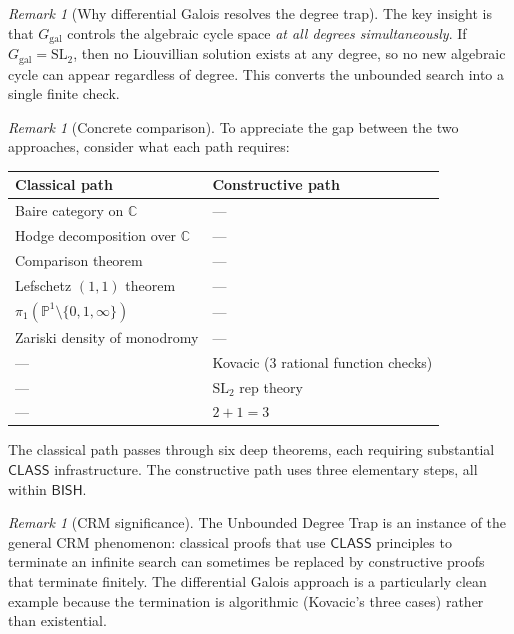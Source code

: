 \documentclass[11pt]{article}
\theoremstyle{plain}
\theoremstyle{definition}
\theoremstyle{remark}
\newtheorem{remark}[theorem]{Remark}
\newcommand{\C}{\mathbb{C}}
\newcommand{\SL}{\mathrm{SL}}
\newcommand{\Ggal}{G_{\mathrm{gal}}}
\newcommand{\BISH}{\mathsf{BISH}}
\newcommand{\CLASS}{\mathsf{CLASS}}
\begin{document}
\begin{remark}[Why differential Galois resolves the degree trap]
The key insight is that $\Ggal$ controls the algebraic cycle space \emph{at all degrees simultaneously}.
If $\Ggal = \SL_2$, then no Liouvillian solution exists at any degree, so no new algebraic cycle can appear regardless of degree.
This converts the unbounded search into a single finite check.
\end{remark}

\begin{remark}[Concrete comparison]
To appreciate the gap between the two approaches, consider what each path requires:
\begin{center}
\small
\begin{tabular}{@{}p{}p{}@{}}
\toprule
\textbf{Classical path} & \textbf{Constructive path} \\
\midrule
Baire category on $\C$ & --- \\
Hodge decomposition over $\C$ & --- \\
Comparison theorem & --- \\
Lefschetz $(1,1)$ theorem & --- \\
$\pi_1(\mathbb{P}^1 \setminus \{0,1,\infty\})$ & --- \\
Zariski density of monodromy & --- \\
--- & Kovacic (3 rational function checks) \\
--- & $\SL_2$ rep theory \\
--- & $2 + 1 = 3$ \\
\bottomrule
\end{tabular}
\end{center}
\noindent
The classical path passes through six deep theorems, each requiring substantial $\CLASS$ infrastructure.
The constructive path uses three elementary steps, all within $\BISH$.
\end{remark}

\begin{remark}[CRM significance]
The Unbounded Degree Trap is an instance of the general CRM phenomenon: classical proofs that use $\CLASS$ principles to terminate an infinite search can sometimes be replaced by constructive proofs that terminate finitely.
The differential Galois approach is a particularly clean example because the termination is algorithmic (Kovacic's three cases) rather than existential.
\end{remark}

\end{document}
